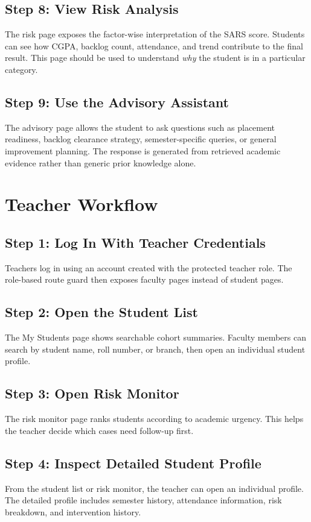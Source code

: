 \subsection{Step 8: View Risk Analysis}
The risk page exposes the factor-wise interpretation of the SARS score. Students can see how CGPA, backlog count, attendance, and trend contribute to the final result. This page should be used to understand \emph{why} the student is in a particular category.

\subsection{Step 9: Use the Advisory Assistant}
The advisory page allows the student to ask questions such as placement readiness, backlog clearance strategy, semester-specific queries, or general improvement planning. The response is generated from retrieved academic evidence rather than generic prior knowledge alone.

\section{Teacher Workflow}
\subsection{Step 1: Log In With Teacher Credentials}
Teachers log in using an account created with the protected teacher role. The role-based route guard then exposes faculty pages instead of student pages.

\subsection{Step 2: Open the Student List}
The My Students page shows searchable cohort summaries. Faculty members can search by student name, roll number, or branch, then open an individual student profile.

\subsection{Step 3: Open Risk Monitor}
The risk monitor page ranks students according to academic urgency. This helps the teacher decide which cases need follow-up first.

\subsection{Step 4: Inspect Detailed Student Profile}
From the student list or risk monitor, the teacher can open an individual profile. The detailed profile includes semester history, attendance information, risk breakdown, and intervention history.

